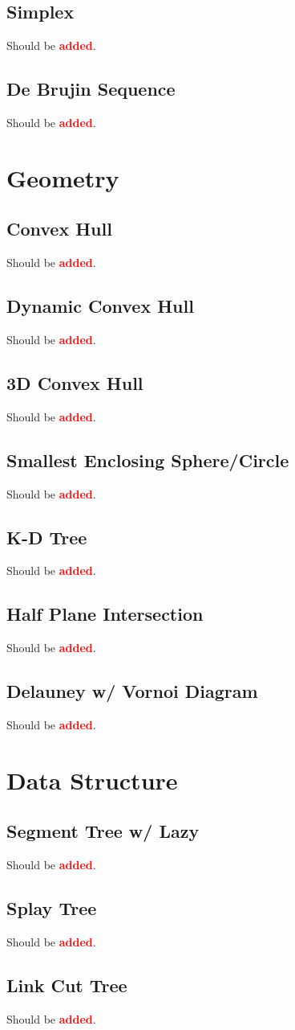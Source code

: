 \documentclass[landscape, 8pt, a4paper, oneside, twocolumn]{extarticle}
\newcommand{\added}{Should be \textcolor{red}{\textbf{added}}.}
\begin{document}
\subsection{Simplex}
\added
\subsection{De Brujin Sequence}
\added

\section{Geometry}
\subsection{Convex Hull}
\added
\subsection{Dynamic Convex Hull}
\added
\subsection{3D Convex Hull}
\added
\subsection{Smallest Enclosing Sphere/Circle}
\added
\subsection{K-D Tree}
\added
\subsection{Half Plane Intersection}
\added
\subsection{Delauney w/ Vornoi Diagram}
\added
\section{Data Structure}
\subsection{Segment Tree w/ Lazy}
\added
\subsection{Splay Tree}
\added
\subsection{Link Cut Tree}
\added
\end{document}
